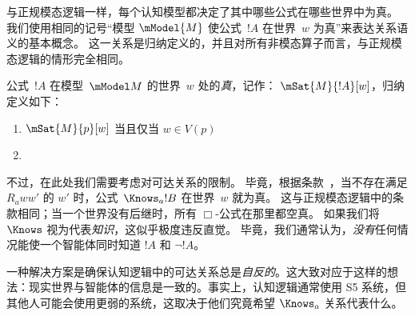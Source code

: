 \documentclass[../../../include/open-logic-section]{subfiles}
\begin{document}


与正规模态逻辑一样，每个认知模型都决定了其中哪些公式在哪些世界中为真。
我们使用相同的记号“模型 $\mModel{M}$ 使公式~$!A$ 在世界~$w$ 为真”来表达关系语义的基本概念。
这一关系是归纳定义的，并且对所有非模态算子而言，与正规模态逻辑的情形完全相同。

\begin{defn}
  公式~$!A$ 在模型~$\mModel M$ 的世界~$w$ 处的\emph{真}，记作：
  $\mSat{M}{!A}[w]$，归纳定义如下：
  \begin{enumerate}
  \item $\mSat{M}{p}[w]$ 当且仅当 $w \in V(p)$
  \item{}
  \end{enumerate}
\end{defn}

不过，在此处我们需要考虑对可达关系的限制。
毕竟，根据条款~，当不存在满足 $R_a ww'$ 的 $w'$ 时，公式~$\Knows_a !B$ 在世界~$w$ 就为真。
这与正规模态逻辑中的条款相同；当一个世界没有后继时，所有 $\Box$-公式在那里都空真。
如果我们将 $\Knows$ 视为代表\emph{知识}，这似乎极度违反直觉。
毕竟，我们通常认为，\emph{没有}任何情况能使一个智能体同时知道 $!A$ 和 $\lnot !A$。

一种解决方案是确保认知逻辑中的可达关系总是\emph{自反的}。这大致对应于这样的想法：现实世界与智能体的信息是一致的。事实上，认知逻辑通常使用 S5 系统，但其他人可能会使用更弱的系统，这取决于他们究竟希望 $\Knows_a$ 关系代表什么。
\end{document}
